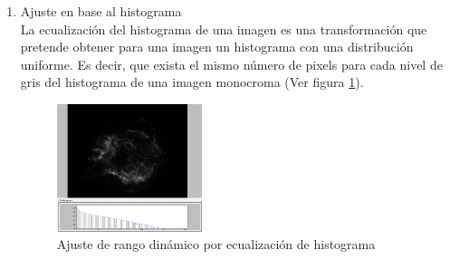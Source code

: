 \begin{enumerate}
		\item Ajuste en base al histograma\\
			La ecualización del histograma de una imagen es una transformación que pretende obtener para una imagen un histograma con una distribución uniforme. Es decir, que exista el mismo número de pixels para cada nivel de gris del histograma de una imagen monocroma (Ver figura \ref{fig:HDRHistograma}).
			\begin{figure}[!htb]
				\centering
				\includegraphics[width=0.4\textwidth]{images/HDREQ/chandraaHistEq.PNG}
				\caption{\label{fig:HDRHistograma}Ajuste de rango dinámico por ecualización de histograma}
			\end{figure}
	\end{enumerate}

